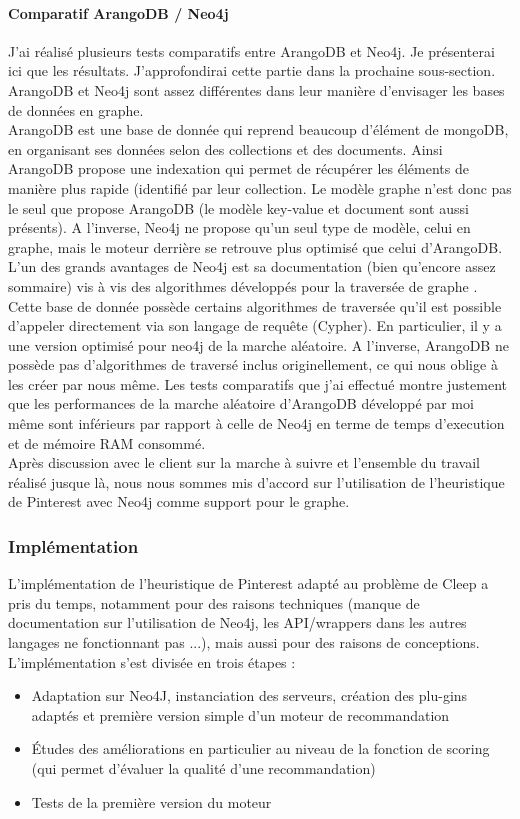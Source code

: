 \documentclass{article} %
\begin{document}
\paragraph{Comparatif ArangoDB / Neo4j\\}
J'ai réalisé plusieurs tests comparatifs entre ArangoDB et Neo4j. Je présenterai ici que les résultats. J'approfondirai cette partie dans la prochaine sous-section. ArangoDB et Neo4j sont assez différentes dans leur manière d'envisager les bases de données en graphe.\\
ArangoDB est une base de donnée qui reprend beaucoup d'élément de mongoDB, en organisant ses données selon des collections et des documents. Ainsi ArangoDB propose une indexation qui permet de récupérer les éléments de manière plus rapide (identifié par leur collection. Le modèle graphe n'est donc pas le seul que propose ArangoDB (le modèle key-value et document sont aussi présents). A l'inverse, Neo4j ne propose qu'un seul type de modèle, celui en graphe, mais le moteur derrière se retrouve plus optimisé que celui d'ArangoDB.\\

L'un des grands avantages de Neo4j est sa documentation (bien qu'encore assez sommaire) vis à vis des algorithmes développés pour la traversée de graphe \cite{neo4j}. Cette base de donnée possède certains algorithmes de traversée qu'il est possible d'appeler directement via son langage de requête (Cypher). En particulier, il y a une version optimisé pour neo4j de la marche aléatoire. A l'inverse, ArangoDB ne possède pas d'algorithmes de traversé inclus originellement, ce qui nous oblige à les créer par nous même. Les tests comparatifs que j'ai effectué montre justement que les performances de la marche aléatoire d'ArangoDB développé par moi même sont inférieurs par rapport à celle de Neo4j en terme de temps d'execution et de mémoire RAM consommé.\\
Après discussion avec le client sur la marche à suivre et l'ensemble du travail réalisé jusque là, nous nous sommes mis d'accord sur l'utilisation de l'heuristique de Pinterest avec Neo4j comme support pour le graphe.

\subsubsection{Implémentation}
L'implémentation de l'heuristique de Pinterest adapté au problème de Cleep a pris du temps, notamment pour des raisons techniques (manque de documentation sur l'utilisation de Neo4j, les API/wrappers dans les autres langages ne fonctionnant pas ...), mais aussi pour des raisons de conceptions. L'implémentation s'est divisée en trois étapes :
\begin{itemize}
	\item Adaptation sur Neo4J, instanciation des serveurs, création des plu-gins adaptés et première version simple d'un moteur de recommandation
	\item Études des améliorations en particulier au niveau de la fonction de scoring (qui permet d'évaluer la qualité d'une recommandation)
	\item Tests de la première version du moteur
\end{itemize}
\end{document}
